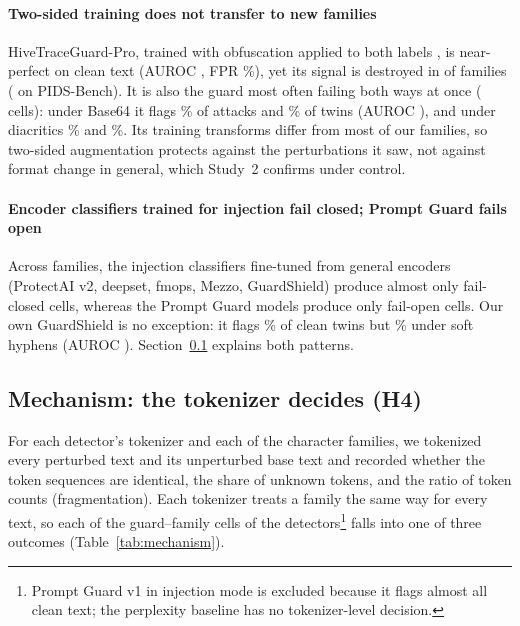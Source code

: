\documentclass[conference]{IEEEtran}
\begin{document}
\paragraph{Two-sided training does not transfer to new families} HiveTraceGuard-Pro, trained with obfuscation applied to both labels \citep{hivetrace2026}, is near-perfect on clean text (AUROC \htCleanAUC{}, FPR \htCleanFPR\%), yet its signal is destroyed in \htDestroyed{} of \nFamilies{} families (\htPidsDestroyed{} on PIDS-Bench). It is also the guard most often failing both ways at once (\htBoth{} cells): under Base64 it flags \htBsfTPR\% of attacks and \htBsfFPR\% of twins (AUROC \htBsfAUC), and under diacritics \htDiacTPR\% and \htDiacFPR\%. Its training transforms differ from most of our families, so two-sided augmentation protects against the perturbations it saw, not against format change in general, which Study~2 confirms under control.

\paragraph{Encoder classifiers trained for injection fail closed; Prompt Guard fails open} Across families, the injection classifiers fine-tuned from general encoders (ProtectAI v2, deepset, fmops, Mezzo, GuardShield) produce almost only fail-closed cells, whereas the Prompt Guard models produce only fail-open cells. Our own GuardShield is no exception: it flags \guardshieldCleanFPR\% of clean twins but \guardshieldShyFPR\% under soft hyphens (AUROC \guardshieldShyAUC). Section~\ref{sec:mechanism} explains both patterns.

\subsection{Mechanism: the tokenizer decides (H4)}
\label{sec:mechanism}

For each detector's tokenizer and each of the \mechCharFamilies{} character families, we tokenized every perturbed text and its unperturbed base text and recorded whether the token sequences are identical, the share of unknown tokens, and the ratio of token counts (fragmentation). Each tokenizer treats a family the same way for every text, so each of the \mechObfCells{} guard--family cells of the \mechGuards{} detectors\footnote{Prompt Guard v1 in injection mode is excluded because it flags almost all clean text; the perplexity baseline has no tokenizer-level decision.} falls into one of three outcomes (Table~\ref{tab:mechanism}).
\end{document}
